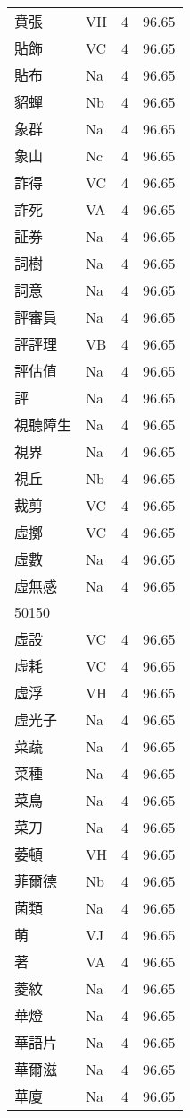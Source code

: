 \documentclass[twocolumn]{book}
\begin{document}
\begin{supertabular}{llrr}
賁張 & VH & 4 &  96.65\\
貼飾 & VC & 4 &  96.65\\
貼布 & Na & 4 &  96.65\\
貂蟬 & Nb & 4 &  96.65\\
象群 & Na & 4 &  96.65\\
象山 & Nc & 4 &  96.65\\
詐得 & VC & 4 &  96.65\\
詐死 & VA & 4 &  96.65\\
証券 & Na & 4 &  96.65\\
詞樹 & Na & 4 &  96.65\\
詞意 & Na & 4 &  96.65\\
評審員 & Na & 4 &  96.65\\
評評理 & VB & 4 &  96.65\\
評估值 & Na & 4 &  96.65\\
評 & Na & 4 &  96.65\\
視聽障生 & Na & 4 &  96.65\\
視界 & Na & 4 &  96.65\\
視丘 & Nb & 4 &  96.65\\
裁剪 & VC & 4 &  96.65\\
虛擲 & VC & 4 &  96.65\\
虛數 & Na & 4 &  96.65\\
虛無感 & Na & 4 &  96.65\\
50150\\
虛設 & VC & 4 &  96.65\\
虛耗 & VC & 4 &  96.65\\
虛浮 & VH & 4 &  96.65\\
虛光子 & Na & 4 &  96.65\\
菜蔬 & Na & 4 &  96.65\\
菜種 & Na & 4 &  96.65\\
菜鳥 & Na & 4 &  96.65\\
菜刀 & Na & 4 &  96.65\\
萎頓 & VH & 4 &  96.65\\
菲爾德 & Nb & 4 &  96.65\\
菌類 & Na & 4 &  96.65\\
萌 & VJ & 4 &  96.65\\
著 & VA & 4 &  96.65\\
菱紋 & Na & 4 &  96.65\\
華燈 & Na & 4 &  96.65\\
華語片 & Na & 4 &  96.65\\
華爾滋 & Na & 4 &  96.65\\
華廈 & Na & 4 &  96.65\\

\end{supertabular}
\end{document}
